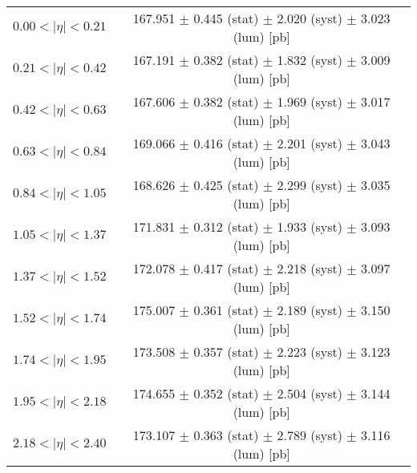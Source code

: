 \begin{tabular}{lc}
\hline
$0.00 < |\eta| <0.21$          & 167.951 $\pm$ 0.445 (stat) $\pm$ 2.020 (syst) $\pm$ 3.023 (lum) [pb]  \\
$0.21 < |\eta| <0.42$          & 167.191 $\pm$ 0.382 (stat) $\pm$ 1.832 (syst) $\pm$ 3.009 (lum) [pb]  \\
$0.42 < |\eta| <0.63$          & 167.606 $\pm$ 0.382 (stat) $\pm$ 1.969 (syst) $\pm$ 3.017 (lum) [pb]  \\
$0.63 < |\eta| <0.84$          & 169.066 $\pm$ 0.416 (stat) $\pm$ 2.201 (syst) $\pm$ 3.043 (lum) [pb]  \\
$0.84 < |\eta| <1.05$          & 168.626 $\pm$ 0.425 (stat) $\pm$ 2.299 (syst) $\pm$ 3.035 (lum) [pb]  \\
$1.05 < |\eta| <1.37$          & 171.831 $\pm$ 0.312 (stat) $\pm$ 1.933 (syst) $\pm$ 3.093 (lum) [pb]  \\
$1.37 < |\eta| <1.52$          & 172.078 $\pm$ 0.417 (stat) $\pm$ 2.218 (syst) $\pm$ 3.097 (lum) [pb]  \\
$1.52 < |\eta| <1.74$          & 175.007 $\pm$ 0.361 (stat) $\pm$ 2.189 (syst) $\pm$ 3.150 (lum) [pb]  \\
$1.74 < |\eta| <1.95$          & 173.508 $\pm$ 0.357 (stat) $\pm$ 2.223 (syst) $\pm$ 3.123 (lum) [pb]  \\
$1.95 < |\eta| <2.18$          & 174.655 $\pm$ 0.352 (stat) $\pm$ 2.504 (syst) $\pm$ 3.144 (lum) [pb]  \\
$2.18 < |\eta| <2.40$          & 173.107 $\pm$ 0.363 (stat) $\pm$ 2.789 (syst) $\pm$ 3.116 (lum) [pb]  \\
\hline
\end{tabular}
